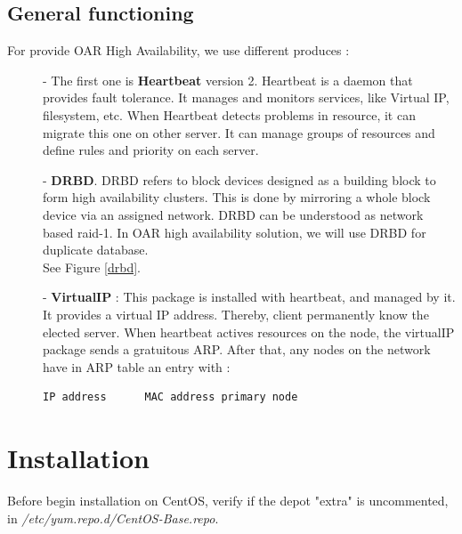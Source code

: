 \documentclass[a4paper,10pt]{report}
\begin{document}
\section{General functioning}
For provide OAR High Availability, we use different produces :
\begin{description}
\item[]- The first one is \textbf{Heartbeat} version 2. Heartbeat is a daemon that provides fault tolerance. It manages and monitors services, like Virtual IP, filesystem, etc. When Heartbeat detects problems in resource, it can migrate this one on other server. It can manage groups of resources and define rules and priority on each server.
\item[]- \textbf{DRBD}. DRBD refers to block devices designed as a building block to form high availability clusters. This is done by mirroring a whole block device via an assigned network. DRBD can be understood as network based raid-1. In OAR high availability solution, we will use DRBD for duplicate database.\\
See Figure \ref{drbd}.
\item[]- \textbf{VirtualIP} : This package is installed with heartbeat, and managed by it. It provides a virtual IP address. Thereby, client permanently know the elected server.
When heartbeat actives resources on the node, the virtualIP package sends a gratuitous ARP. After that, any nodes on the network have in ARP table an entry with :
\begin{lstlisting}
IP address		MAC address primary node
\end{lstlisting}

\end{description}













\chapter{Installation}

Before begin installation on CentOS, verify if the depot "extra" is uncommented, in \textit{/etc/yum.repo.d/CentOS-Base.repo}.
\end{document}

